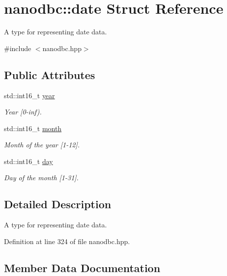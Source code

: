 \hypertarget{structnanodbc_1_1date}{}\section{nanodbc\+::date Struct Reference}
\label{structnanodbc_1_1date}


A type for representing date data.  




{\ttfamily \#include $<$nanodbc.\+hpp$>$}

\subsection*{Public Attributes}
\begin{DoxyCompactItemize}
\item 
std\+::int16\+\_\+t \mbox{\hyperlink{structnanodbc_1_1date_ae394db699ea928e8c022eafa1ed0acb2}{year}}
\begin{DoxyCompactList}\small\item\em Year \mbox{[}0-\/inf). \end{DoxyCompactList}\item 
std\+::int16\+\_\+t \mbox{\hyperlink{structnanodbc_1_1date_a041c454a0d601ee4467e50267f02a297}{month}}
\begin{DoxyCompactList}\small\item\em Month of the year \mbox{[}1-\/12\mbox{]}. \end{DoxyCompactList}\item 
std\+::int16\+\_\+t \mbox{\hyperlink{structnanodbc_1_1date_ad796f131143db2ceb9277f52745b8d33}{day}}
\begin{DoxyCompactList}\small\item\em Day of the month \mbox{[}1-\/31\mbox{]}. \end{DoxyCompactList}\end{DoxyCompactItemize}


\subsection{Detailed Description}
A type for representing date data. 

Definition at line 324 of file nanodbc.\+hpp.



\subsection{Member Data Documentation}
\mbox{\label{structnanodbc_1_1date_ad796f131143db2ceb9277f52745b8d33}} 
